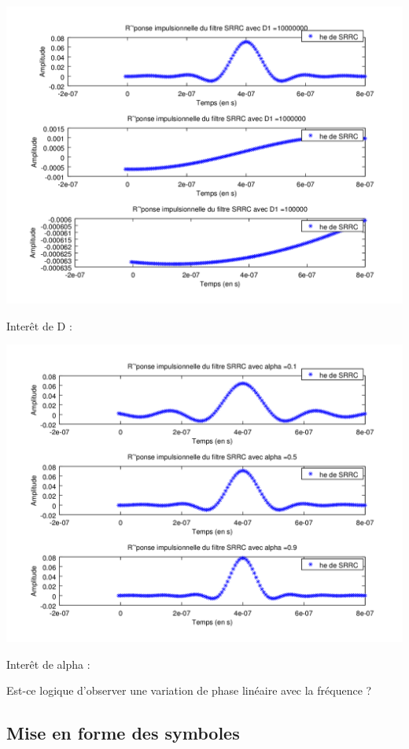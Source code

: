\documentclass{acm_proc_article-sp}
\begin{document}
\begin{center}
\includegraphics[scale=0.45]{SRRC_varD_3.png}

Interêt de D : 

\includegraphics[scale=0.45]{SRRC_varAlpha_3.png}
\end{center}

Interêt de alpha :

Est-ce logique d'observer une variation de phase linéaire avec la fréquence ?

\subsection{Mise en forme des symboles}
\end{document}
